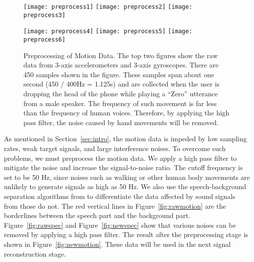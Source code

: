 \begin{figure}[H]
	\begin{minipage}[t]{.45\linewidth}
		\centering
		\texttt{[image: preprocess1]}
		\texttt{[image: preprocess2]}
		\vspace{-.2in}
		\label{fig:rawmotion}
		\vspace{.2in}
		\texttt{[image: preprocess3]}
		\vspace{-.2in}
		\label{fig:rawspec}
	\end{minipage}
	\begin{minipage}[t]{.05\linewidth}
		\quad
	\end{minipage}
	\begin{minipage}[t]{.45\linewidth}
		\centering
		\texttt{[image: preprocess4]}
		\vspace{-.2in}
		\label{fig:newspec}
		\vspace{.2in}
		\texttt{[image: preprocess5]}
		\texttt{[image: preprocess6]}
		\vspace{-.2in}
		\label{fig:newmotion}
	\end{minipage}
	
	\caption[Preprocessing of Motion Data. ]{Preprocessing of Motion Data. The top two figures show the raw data from 3-axis accelerometers and 3-axis gyroscopes. There are 450 samples shown in the figure. These samples span about one second (450 / 400Hz = 1.125s) and are collected when the user is dropping the head of the phone while playing a ``Zero'' utterance from a male speaker. The frequency of such movement is far less than the frequency of human voices. Therefore, by applying the high pass filter, the noise caused by hand movements will be removed. }
	
	\label{fig:spyphonepreprocess}
\end{figure}

As mentioned in Section~\ref{sec:intro}, the motion data is impeded by low sampling rates, weak target signals, and large interference noises. To overcome such problems, we must preprocess the motion data. We apply a high pass filter to mitigate the noise and increase the signal-to-noise ratio. The cutoff frequency is set to be 50 Hz, since noises such as walking or other human body movements are unlikely to generate signals as high as 50 Hz.
We also use the speech-background separation algorithms from \cite{rabiner2011theory} to differentiate the data affected by sound signals from those do not. The red vertical lines in Figure~\ref{fig:rawmotion} are the borderlines between the speech part and the background part. 
Figure~\ref{fig:rawspec} and Figure~\ref{fig:newspec} show that various noises can be removed by applying a high pass filter.
The result after the preprocessing stage is shown in Figure~\ref{fig:newmotion}. These data will be used in the next signal reconstruction stage.



